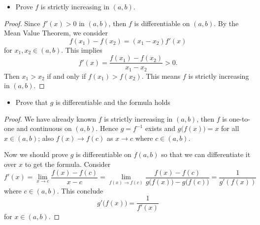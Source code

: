 \begin{Exercise}
\begin{itemize}
\item Prove $f$ is strictly increasing in $(a,b)$.
\end{itemize}
\begin{proof}
Since $f'(x) > 0$ in $(a,b)$, then $f$ is differentiable on $(a,b)$. 
By the Mean Value Theorem, we consider
$$
f(x_1) - f(x_2) = (x_1 - x_2) f'(x)
$$
for $x_1,x_2\in (a,b)$. This implies
$$
f'(x) = \frac{f(x_1)-f(x_2)}{x_1-x_2} > 0.
$$
Then $x_1 > x_2$ if and only if $f(x_1) > f(x_2)$. This means $f$ is strictly increasing in $(a,b)$.
\end{proof}
\begin{itemize}
\item Prove that $g$ is differentiable and the formula holds
\end{itemize}
\begin{proof}
We have already known $f$ is strictly increasing in $(a,b)$, then $f$ is one-to-one and continuous on $(a,b)$. 
Hence $g = f^{-1}$ exists and $g\big( f(x) \big) = x$ for all $x\in(a,b)$; also $f(x)\to f(c)$ as $x\to c$ where $c\in(a,b)$.

Now we should prove $g$ is differentiable on $f(a,b)$ so that we can differentiate it over $x$ to get the formula.
Consider
$$
f'(x) = \lim_{x\to c}\frac{f(x)-f(c)}{x-c}
= \lim_{f(x)\to f(c)}\frac{f(x)-f(c)}{g\big( f(x) \big) - g\big( f(c) \big)}
= \frac{1}{g'(f(x))}
$$
where $c\in(a,b)$. This conclude
$$
g'\big( f(x) \big) = \frac{1}{f'(x)}
$$
for $x\in(a,b)$.
\end{proof}
\end{Exercise}